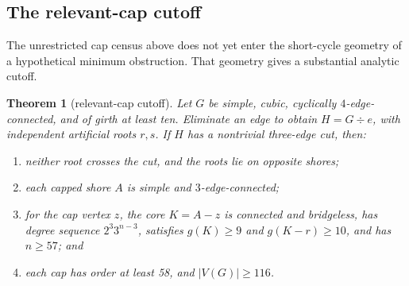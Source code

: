 \documentclass[11pt]{article}
\newtheorem{theorem}{Theorem}
\theoremstyle{definition}
\theoremstyle{remark}
\begin{document}
\subsection{The relevant-cap cutoff}

The unrestricted cap census above does not yet enter the short-cycle
geometry of a hypothetical minimum obstruction.  That geometry gives a
substantial analytic cutoff.

\begin{theorem}[relevant-cap cutoff]\label{thm:relevant-cap-cutoff}
Let $G$ be simple, cubic, cyclically $4$-edge-connected, and of girth at
least ten.  Eliminate an edge to obtain $H=G\div e$, with independent
artificial roots $r,s$.  If $H$ has a nontrivial three-edge cut, then:
\begin{enumerate}
 \item neither root crosses the cut, and the roots lie on opposite shores;
 \item each capped shore $A$ is simple and $3$-edge-connected;
 \item for the cap vertex $z$, the core $K=A-z$ is connected and
 bridgeless, has degree sequence $2^3 3^{n-3}$, satisfies
 $g(K)\geq9$ and $g(K-r)\geq10$, and has $n\geq57$; and
 \item each cap has order at least 58, and $|V(G)|\geq116$.
\end{enumerate}
\end{theorem}
\end{document}
